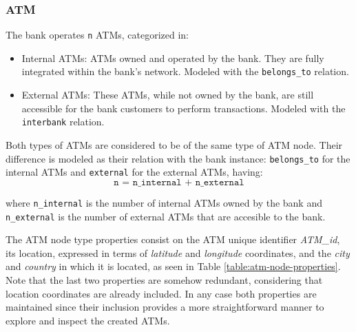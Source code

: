 \documentclass{article}
\begin{document}


\subsubsection*{ATM}



The bank operates \texttt{n} ATMs, categorized in:

\begin{itemize}
  \item Internal ATMs: ATMs owned and operated by the bank. They are fully integrated within the
  bank's network. Modeled with the \texttt{belongs\_to} relation.
  \item External ATMs: These ATMs, while not owned by the bank, are still accessible for the bank
  customers to perform transactions.  Modeled with the \texttt{interbank}  relation. 
\end{itemize}

Both types of ATMs are considered to be of the same type of ATM node. Their difference
is modeled as their relation with the bank instance: \texttt{belongs\_to} for the internal ATMs and \texttt{external} for the external ATMs, having:
$$\texttt{n = n\_internal + n\_external}$$

where \texttt{n\_internal} is the number of internal ATMs owned by the bank and \texttt{n\_external}
is the number of external ATMs that are accesible to the bank.


The ATM node type properties consist on the ATM unique identifier \emph{ATM\_id}, its location, expressed in terms of 
\emph{latitude} and \emph{longitude} coordinates, and the \emph{city} and 
\emph{country} in which it is located, as seen in Table \ref{table:atm-node-properties}.
Note that the last
two properties are somehow redundant, considering that location coordinates
are already included. In any case both properties are maintained since their inclusion provides a more straightforward manner to explore and inspect the created
ATMs.
\end{document}
